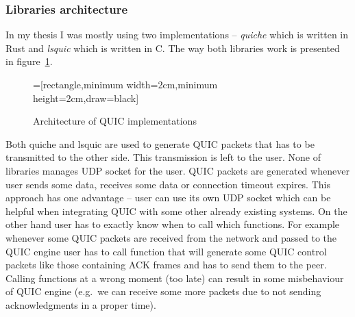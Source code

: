 \subsubsection{Libraries architecture}
In my thesis I was mostly using two implementations -- \textit{quiche} which is written in Rust and \textit{lsquic} which is written in C\@.
The way both libraries work is presented in figure~\ref{fig:quic-implementations-architecture}.
\begin{figure}
    \centering
    =[rectangle,minimum width=2cm,minimum height=2cm,draw=black]
    \caption{Architecture of QUIC implementations}
    \label{fig:quic-implementations-architecture}
\end{figure}
Both quiche and lsquic are used to generate QUIC packets that has to be transmitted to the other side.
This transmission is left to the user.
None of libraries manages UDP socket for the user.
QUIC packets are generated whenever user sends some data, receives some data or connection timeout expires.
This approach has one advantage -- user can use its own UDP socket which can be helpful when integrating QUIC
with some other already existing systems.
On the other hand user has to exactly know when to call which functions.
For example whenever some QUIC packets are received from the network and passed to the QUIC engine
user has to call function that will generate some QUIC control packets like those containing ACK frames
and has to send them to the peer.
Calling functions at a wrong moment (too late) can result in some misbehaviour of QUIC engine (e.g.\
we can receive some more packets due to not sending acknowledgments in a proper time).

